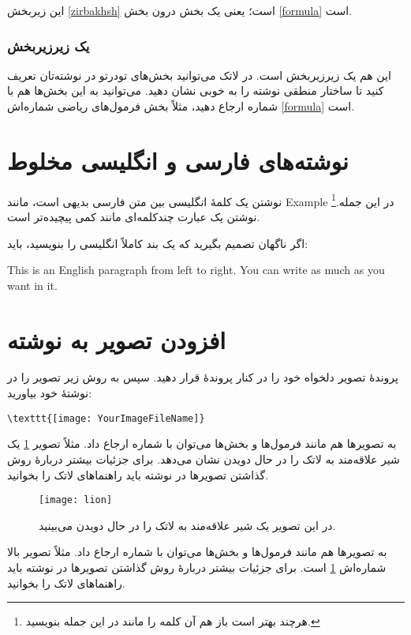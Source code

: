 این زیربخش \ref{zirbakhsh} است؛ یعنی یک بخش درون بخش \ref{formula} است.
\subsubsection{یک زیرزیربخش}
این هم یک زیرزیربخش است. در لاتک می‌توانید بخش‌های تودرتو در نوشته‌تان تعریف کنید تا ساختار منطقی نوشته را به خوبی نشان دهید. می‌توانید به این بخش‌ها هم با شماره ارجاع دهید، مثلاً بخش فرمول‌های ریاضی شماره‌اش \ref{formula} است.
\section{نوشته‌های فارسی و انگلیسی مخلوط}
نوشتن یک کلمهٔ انگلیسی بین متن فارسی بدیهی است، مانند Example در این جمله.\footnote{هرچند بهتر است باز هم آن کلمه را مانند  در این جمله بنویسید.}
نوشتن یک عبارت چندکلمه‌ای مانند
  کمی پیچیده‌تر است.

اگر ناگهان تصمیم بگیرید که یک بند کاملاً انگلیسی را بنویسید، باید:
\begin{latin}
This is an English paragraph from left to right. You can write as much as you want in it.
\end{latin}
\section{افزودن تصویر به نوشته}
پروندهٔ تصویر دلخواه خود را در کنار پروندهٔ  قرار دهید. سپس به روش زیر تصویر را در نوشتهٔ خود بیاورید:
\begin{latin}
\begin{verbatim}
\texttt{[image: YourImageFileName]}
\end{verbatim}
\end{latin}
به تصویرها هم مانند فرمول‌ها و بخش‌ها می‌توان با شماره ارجاع داد. مثلاً تصویر \ref{fig:shir} یک شیر علاقه‌مند به لاتک را در حال دویدن نشان می‌دهد. برای جزئیات بیشتر دربارهٔ روش گذاشتن تصویرها در نوشته باید راهنماهای لاتک را بخوانید.
\begin{figure}[ht]
\centerline{\texttt{[image: lion]}}
\caption{در این تصویر یک شیر علاقه‌مند به لاتک را در حال دویدن می‌بینید.}
\label{fig:shir}
\end{figure}

به تصویرها هم مانند فرمول‌ها و بخش‌ها می‌توان با شماره ارجاع داد. مثلاً تصویر بالا شماره‌اش \ref{fig:shir} است. برای جزئیات بیشتر دربارهٔ روش گذاشتن تصویرها در نوشته باید راهنماهای لاتک را بخوانید.

